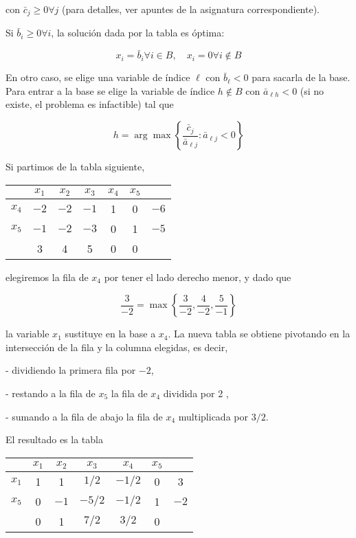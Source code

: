 \documentclass[openany]{book}
\begin{document}
con $\bar{c}_{j} \geq 0 \forall j$ (para detalles, ver apuntes de la asignatura correspondiente).

Si $\bar{b}_{i} \geq 0 \forall i$, la solución dada por la tabla es óptima:

$$
x_{i}=\bar{b}_{i} \forall i \in B, \quad x_{i}=0 \forall i \notin B
$$

En otro caso, se elige una variable de índice $\ell$ con $\bar{b}_{\ell}<0$ para sacarla de la base. Para entrar a la base se elige la variable de índice $h \notin B$ con $\bar{a}_{\ell h}<0$ (si no existe, el problema es infactible) tal que

$$
h=\arg \max \left\{\frac{\bar{c}_{j}}{\bar{a}_{\ell j}}: \bar{a}_{\ell j}<0\right\}
$$

\begin{example}

  Si partimos de la tabla siguiente,

  \begin{tabular}{c|ccccc|c}
  \hline & $x_{1}$ & $x_{2}$ & $x_{3}$ & $x_{4}$ & $x_{5}$ & \\
  \hline$x_{4}$ & $-2$ & $-2$ & $-1$ & 1 & 0 & $-6$ \\
  $x_{5}$ & $-1$ & $-2$ & $-3$ & 0 & 1 & $-5$ \\
  \hline & 3 & 4 & 5 & 0 & 0 & \\
  \hline
  \end{tabular}

  elegiremos la fila de $x_{4}$ por tener el lado derecho menor, y dado que

  $$
  \frac{3}{-2}=\max \left\{\frac{3}{-2}, \frac{4}{-2}, \frac{5}{-1}\right\}
  $$

  la variable $x_{1}$ sustituye en la base a $x_{4}$. La nueva tabla se obtiene pivotando en la intersección de la fila y la columna elegidas, es decir,

  - dividiendo la primera fila por $-2$,

  - restando a la fila de $x_{5}$ la fila de $x_{4}$ dividida por 2 ,

  - sumando a la fila de abajo la fila de $x_{4}$ multiplicada por $3 / 2$.

  El resultado es la tabla

  \begin{tabular}{c|ccccc|c}
  \hline & $x_{1}$ & $x_{2}$ & $x_{3}$ & $x_{4}$ & $x_{5}$ & \\
  \hline$x_{1}$ & 1 & 1 & $1 / 2$ & $-1 / 2$ & 0 & 3 \\
  $x_{5}$ & 0 & $-1$ & $-5 / 2$ & $-1 / 2$ & 1 & $-2$ \\
  \hline & 0 & 1 & $7 / 2$ & $3 / 2$ & 0 & \\
  \hline
  \end{tabular}


\end{example}
\end{document}

